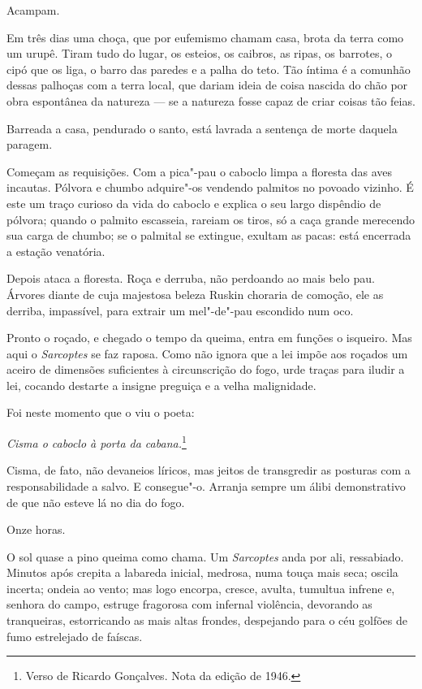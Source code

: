 Acampam.

Em três dias uma choça, que por eufemismo chamam casa, brota da terra
como um urupê. Tiram tudo do lugar, os esteios, os caibros, as ripas, os
barrotes, o cipó que os liga, o barro das paredes e a palha do teto. Tão
íntima é a comunhão dessas palhoças com a terra local, que dariam ideia
de coisa nascida do chão por obra espontânea da natureza --- se a
natureza fosse capaz de criar coisas tão feias.

Barreada a casa, pendurado o santo, está lavrada a sentença de morte
daquela paragem.

Começam as requisições. Com a pica"-pau o caboclo limpa a floresta das
aves incautas. Pólvora e chumbo adquire"-os vendendo palmitos no povoado
vizinho. É este um traço curioso da vida do caboclo e explica o seu
largo dispêndio de pólvora; quando o palmito escasseia, rareiam os
tiros, só a caça grande merecendo sua carga de chumbo; se o palmital se
extingue, exultam as pacas: está encerrada a estação venatória.

Depois ataca a floresta. Roça e derruba, não perdoando ao mais belo pau.
Árvores diante de cuja majestosa beleza Ruskin choraria de comoção, ele
as derriba, impassível, para extrair um mel"-de"-pau escondido num oco.

Pronto o roçado, e chegado o tempo da queima, entra em funções o
isqueiro. Mas aqui o \emph{Sarcoptes} se faz raposa. Como não ignora que
a lei impõe aos roçados um aceiro de dimensões suficientes à
circunscrição do fogo, urde traças para iludir a lei, cocando destarte a
insigne preguiça e a velha malignidade.

Foi neste momento que o viu o poeta:

\emph{Cisma o caboclo à porta da cabana.}\footnote{Verso de Ricardo
  Gonçalves. Nota da edição de 1946.}

Cisma, de fato, não devaneios líricos, mas jeitos de transgredir as
posturas com a responsabilidade a salvo. E consegue"-o. Arranja sempre um
álibi demonstrativo de que não esteve lá no dia do fogo.

Onze horas.

O sol quase a pino queima como chama. Um \emph{Sarcoptes} anda por ali,
ressabiado. Minutos após crepita a labareda inicial, medrosa, numa touça
mais seca; oscila incerta; ondeia ao vento; mas logo encorpa, cresce,
avulta, tumultua infrene e, senhora do campo, estruge fragorosa com
infernal violência, devorando as tranqueiras, estorricando as mais altas
frondes, despejando para o céu golfões de fumo estrelejado de faíscas.

